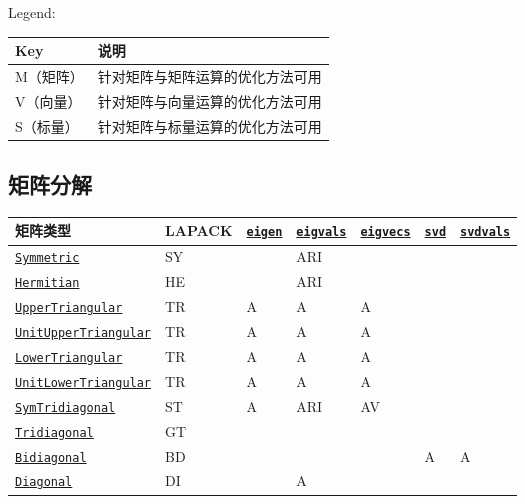 \begin{table}[h]
\end{table}



Legend:




\begin{table}[h]

\begin{tabulary}{\linewidth}{|L|L|}
\hline
Key & 说明 \\
\hline
M（矩阵） & 针对矩阵与矩阵运算的优化方法可用 \\
\hline
V（向量） & 针对矩阵与向量运算的优化方法可用 \\
\hline
S（标量） & 针对矩阵与标量运算的优化方法可用 \\
\hline
\end{tabulary}

\end{table}



\hypertarget{1342260614444700345}{}


\subsection{矩阵分解}




\begin{table}[h]

\begin{tabulary}{\linewidth}{|L|L|L|L|L|L|L|}
\hline
矩阵类型 & LAPACK & \hyperlink{11056016707394839114}{\texttt{eigen}} & \hyperlink{12334018763942871611}{\texttt{eigvals}} & \hyperlink{8591842276375230542}{\texttt{eigvecs}} & \hyperlink{6661056220970412040}{\texttt{svd}} & \hyperlink{12905968661134086149}{\texttt{svdvals}} \\
\hline
\hyperlink{17683454167504168761}{\texttt{Symmetric}} & SY &  & ARI &  &  &  \\
\hline
\hyperlink{938713992181310063}{\texttt{Hermitian}} & HE &  & ARI &  &  &  \\
\hline
\hyperlink{6344726545165008167}{\texttt{UpperTriangular}} & TR & A & A & A &  &  \\
\hline
\hyperlink{17221720404477798393}{\texttt{UnitUpperTriangular}} & TR & A & A & A &  &  \\
\hline
\hyperlink{15116078732779234709}{\texttt{LowerTriangular}} & TR & A & A & A &  &  \\
\hline
\hyperlink{2163321084999097240}{\texttt{UnitLowerTriangular}} & TR & A & A & A &  &  \\
\hline
\hyperlink{6062797780727203318}{\texttt{SymTridiagonal}} & ST & A & ARI & AV &  &  \\
\hline
\hyperlink{17820886359515748171}{\texttt{Tridiagonal}} & GT &  &  &  &  &  \\
\hline
\hyperlink{6156150905679680892}{\texttt{Bidiagonal}} & BD &  &  &  & A & A \\
\hline
\hyperlink{3300114559258360989}{\texttt{Diagonal}} & DI &  & A &  &  &  \\
\hline
\end{tabulary}

\end{table}



